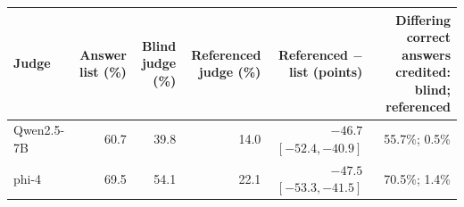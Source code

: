 \begin{tabular}{lrrrrr}
\toprule
Judge & Answer list (\%) & Blind judge (\%) & Referenced judge (\%) & Referenced $-$ list (points) & Differing correct answers credited: blind; referenced \\
\midrule
Qwen2.5-7B & 60.7 & 39.8 & 14.0 & $-46.7$ {\scriptsize$[-52.4,-40.9]$} & 55.7\%; 0.5\% \\
phi-4 & 69.5 & 54.1 & 22.1 & $-47.5$ {\scriptsize$[-53.3,-41.5]$} & 70.5\%; 1.4\% \\
\bottomrule
\end{tabular}

